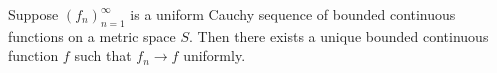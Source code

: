 Suppose $(f_n)_{n=1}^{\infty}$ is a uniform Cauchy sequence of bounded continuous functions on a metric space $S$. Then there exists a unique bounded continuous function $f$ such that $f_n \to f$ uniformly.
